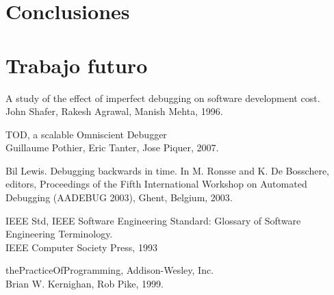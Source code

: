 \documentclass[12pt,legalpaper]{report}
\begin{document}
\chapter{Conclusiones}
\chapter{Trabajo futuro}
\newpage


\begin{thebibliography}{30}


 A study of the effect of  imperfect debugging on software development cost.\\
John Shafer, Rakesh Agrawal, Manish Mehta, 1996.


 TOD, a scalable Omniscient Debugger\\
Guillaume Pothier, Eric Tanter, Jose Piquer, 2007.



 Bil Lewis. Debugging backwards in time. In M. Ronsse and K. De Bosschere,
editors, Proceedings of the Fifth International Workshop on Automated Debugging
(AADEBUG 2003), Ghent, Belgium, 2003.


 IEEE Std, IEEE Software Engineering Standard: Glossary of Software Engineering Terminology.\\
IEEE Computer Society Press, 1993


 thePracticeOfProgramming, Addison-Wesley, Inc.\\
Brian W. Kernighan, Rob Pike, 1999. 


\end{thebibliography}
\end{document}
